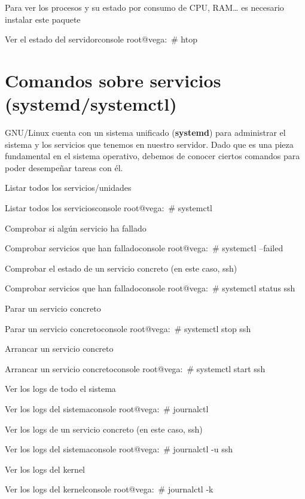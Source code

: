 Para ver los procesos y su estado por consumo de CPU, RAM… es necesario instalar este paquete
\begin{mycode}{Ver el estado del servidor}{console}{}
root@vega:~# htop
\end{mycode}

\section{Comandos sobre servicios (systemd/systemctl)}
GNU/Linux cuenta con un sistema unificado (\textbf{systemd}) para administrar el sistema y los servicios que tenemos en nuestro servidor. Dado que es una pieza fundamental en el sistema operativo, debemos de conocer ciertos comandos para poder desempeñar tareas con él.

Listar todos los servicios/unidades
\begin{mycode}{Listar todos los servicios}{console}{}
root@vega:~# systemctl
\end{mycode}

Comprobar si algún servicio ha fallado
\begin{mycode}{Comprobar servicios que han fallado}{console}{}
root@vega:~# systemctl --failed
\end{mycode}

Comprobar el estado de un servicio concreto (en este caso, ssh)
\begin{mycode}{Comprobar servicios que han fallado}{console}{}
root@vega:~# systemctl status ssh
\end{mycode}

Parar un servicio concreto
\begin{mycode}{Parar un servicio concreto}{console}{}
root@vega:~# systemctl stop ssh
\end{mycode}

Arrancar un servicio concreto
\begin{mycode}{Arrancar un servicio concreto}{console}{}
root@vega:~# systemctl start ssh
\end{mycode}

Ver los logs de todo el sistema
\begin{mycode}{Ver los logs del sistema}{console}{}
root@vega:~# journalctl
\end{mycode}

Ver los logs de un servicio concreto (en este caso, ssh)
\begin{mycode}{Ver los logs del sistema}{console}{}
root@vega:~# journalctl -u ssh
\end{mycode}

Ver los logs del kernel
\begin{mycode}{Ver los logs del kernel}{console}{}
root@vega:~# journalctl -k
\end{mycode}
